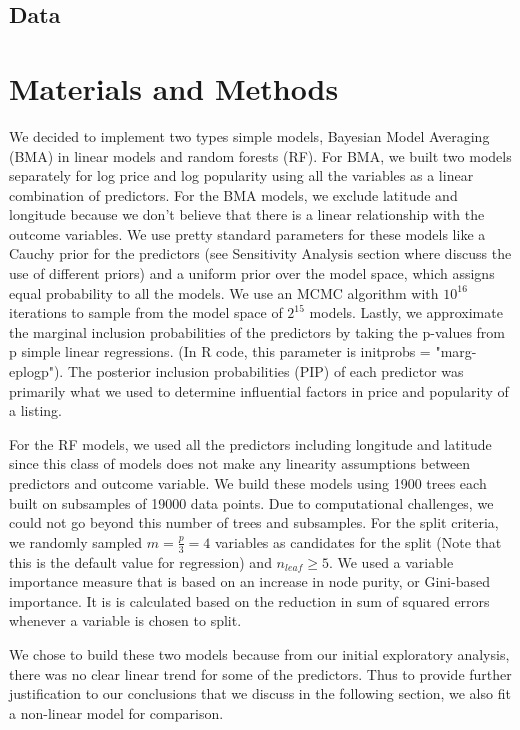 \documentclass{article}
\begin{document}
\subsection{Data} 



\section{Materials and Methods} 

We decided to implement two types simple models, Bayesian Model Averaging (BMA) in linear models and random forests (RF). For BMA, we built two models separately for log price and log popularity using all the variables as a linear combination of predictors. For the BMA models, we exclude latitude and longitude because we don't believe that there is a linear relationship with the outcome variables. We use pretty standard parameters for these models like a Cauchy prior for the predictors (see Sensitivity Analysis section where discuss the use of different priors) and a uniform prior over the model space, which assigns equal probability to all the models. We use an MCMC algorithm with $10^{16}$ iterations to sample from the model space of $2^{15}$ models. Lastly, we approximate the marginal inclusion probabilities of the predictors by taking the p-values from p simple linear regressions. (In R code, this parameter is initprobs = "marg-eplogp"). The posterior inclusion probabilities (PIP) of each predictor was primarily what we used to determine influential factors in price and popularity of a listing. 

For the RF models, we used all the predictors including longitude and latitude since this class of models does not make any linearity assumptions between predictors and outcome variable. We build these models using 1900 trees each built on subsamples of 19000 data points. Due to computational challenges, we could not go beyond this number of trees and subsamples. For the split criteria, we randomly sampled $m = \frac{p}{3} = 4$ variables as candidates for the split (Note that this is the default value for regression) and $n_{leaf} \geq 5$. We used a variable importance measure that is based on an increase in node purity, or Gini-based importance. It is is calculated based on the reduction in sum of squared errors whenever a variable is chosen to split.

We chose to build these two models because from our initial exploratory analysis, there was no clear linear trend for some of the predictors. Thus to provide further justification to our conclusions that we discuss in the following section, we also fit a non-linear model for comparison. 
\end{document}
